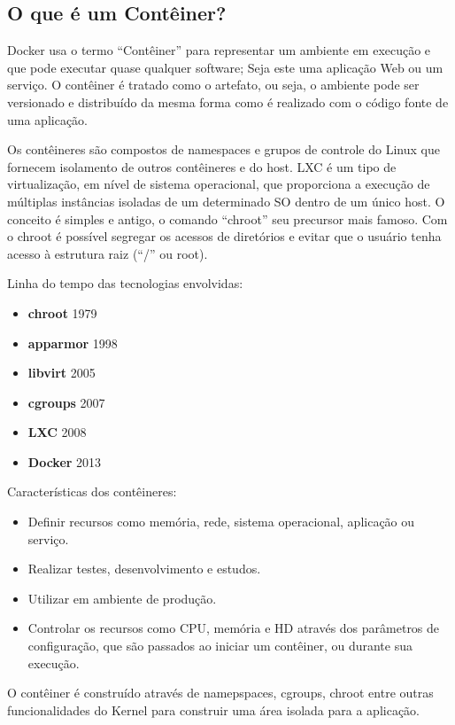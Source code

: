 \documentclass[a4paper,11pt]{article}
\begin{document}
\subsection{O que é um Contêiner?}
Docker usa o termo ``Contêiner'' para representar um ambiente em execução e que pode executar quase qualquer software; Seja este uma aplicação Web ou um serviço. O contêiner é tratado como o artefato, ou seja, o ambiente pode ser versionado e distribuído da mesma forma como é realizado com o código fonte de uma aplicação. 

Os contêineres são compostos de namespaces e grupos de controle do Linux que fornecem isolamento de outros contêineres e do host. LXC é um tipo de virtualização, em nível de sistema operacional, que proporciona a execução de múltiplas instâncias isoladas de um determinado SO dentro de um único host. O conceito é simples e antigo, o comando ``chroot'' seu precursor mais famoso. Com o chroot é possível segregar os acessos de diretórios e evitar que o usuário tenha acesso à estrutura raiz (“/” ou root).

Linha do tempo das tecnologias envolvidas: \vspace{-1em}
\begin{itemize}
	\item \textbf{chroot} 1979
	\item \textbf{apparmor} 1998
	\item \textbf{libvirt} 2005
	\item \textbf{cgroups} 2007
	\item \textbf{LXC} 2008
	\item \textbf{Docker} 2013
\end{itemize}

Características dos contêineres: \vspace{-1em}
\begin{itemize}
  \item Definir recursos como memória, rede, sistema operacional, 
aplicação ou serviço. 
  \item Realizar testes, desenvolvimento e estudos.
  \item Utilizar em ambiente de produção.
  \item Controlar os recursos como CPU, memória e HD através dos parâmetros 
de configuração, que são passados ao iniciar um contêiner, ou durante sua 
execução.
\end{itemize}

O contêiner é construído através de namepspaces, cgroups, chroot entre outras 
funcionalidades do Kernel para construir uma área isolada para a aplicação.
\end{document}
